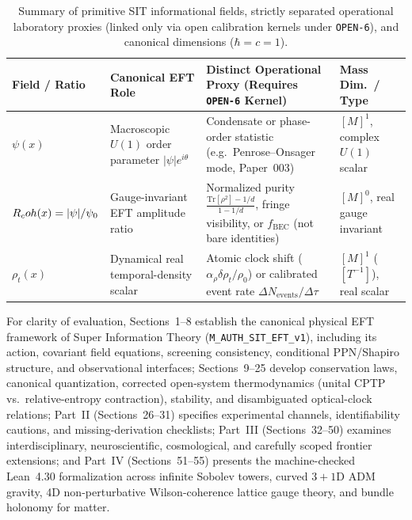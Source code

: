 \begin{table}[htbp]
\centering
\caption{Summary of primitive SIT informational fields, strictly separated operational laboratory proxies (linked only via open calibration kernels under \texttt{OPEN-6}), and canonical dimensions ($\hbar = c = 1$).}
\label{tab:primitive-fields-summary}
\vspace{0.4em}
\footnotesize
\begin{tabular}{|p{2.9cm}|p{3.9cm}|p{4.3cm}|p{3.3cm}|}
\hline
\textbf{Field / Ratio} & \textbf{Canonical EFT Role} & \textbf{Distinct Operational Proxy (Requires \texttt{OPEN-6} Kernel)} & \textbf{Mass Dim.\ / Type} \\
\hline
$\psi(x)$ & Macroscopic $U(1)$ order parameter $|\psi|e^{i\theta}$ & Condensate or phase-order statistic (e.g.\ Penrose--Onsager mode, Paper~003) & $[M]^1$, complex $U(1)$ scalar \\
$R_coh(x) = |\psi|/\psi_0$ & Gauge-invariant EFT amplitude ratio & Normalized purity $\frac{\mathrm{Tr}[\rho^2]-1/d}{1-1/d}$, fringe visibility, or $f_{\mathrm{BEC}}$ (not bare identities) & $[M]^0$, real gauge invariant \\
$\rho_t(x)$ & Dynamical real temporal-density scalar & Atomic clock shift ($\alpha_\rho \delta\rho_t/\rho_0$) or calibrated event rate $\Delta N_{\mathrm{events}}/\Delta\tau$ & $[M]^1$ ($[T^{-1}]$), real scalar \\
\hline
\end{tabular}
\end{table}

For clarity of evaluation, Sections~1--8 establish the canonical physical EFT framework of Super Information Theory (\texttt{M\_AUTH\_SIT\_EFT\_v1}), including its action, covariant field equations, screening consistency, conditional PPN/Shapiro structure, and observational interfaces; Sections~9--25 develop conservation laws, canonical quantization, corrected open-system thermodynamics (unital CPTP vs.\ relative-entropy contraction), stability, and disambiguated optical-clock relations; Part~II (Sections~26--31) specifies experimental channels, identifiability cautions, and missing-derivation checklists; Part~III (Sections~32--50) examines interdisciplinary, neuroscientific, cosmological, and carefully scoped frontier extensions; and Part~IV (Sections~51--55) presents the machine-checked Lean~4.30 formalization across infinite Sobolev towers, curved $3+1$D ADM gravity, 4D non-perturbative Wilson-coherence lattice gauge theory, and bundle holonomy for matter.

